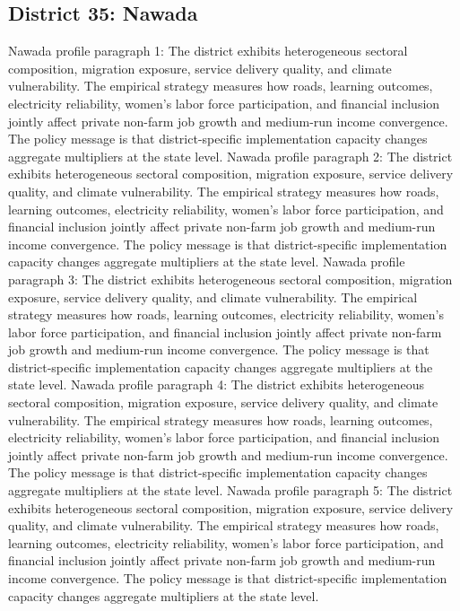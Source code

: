 \documentclass[preprint,12pt]{elsarticle}
\begin{document}
\subsection{District 35: Nawada}
Nawada profile paragraph 1: The district exhibits heterogeneous sectoral composition, migration exposure, service delivery quality, and climate vulnerability. The empirical strategy measures how roads, learning outcomes, electricity reliability, women's labor force participation, and financial inclusion jointly affect private non-farm job growth and medium-run income convergence. The policy message is that district-specific implementation capacity changes aggregate multipliers at the state level.
Nawada profile paragraph 2: The district exhibits heterogeneous sectoral composition, migration exposure, service delivery quality, and climate vulnerability. The empirical strategy measures how roads, learning outcomes, electricity reliability, women's labor force participation, and financial inclusion jointly affect private non-farm job growth and medium-run income convergence. The policy message is that district-specific implementation capacity changes aggregate multipliers at the state level.
Nawada profile paragraph 3: The district exhibits heterogeneous sectoral composition, migration exposure, service delivery quality, and climate vulnerability. The empirical strategy measures how roads, learning outcomes, electricity reliability, women's labor force participation, and financial inclusion jointly affect private non-farm job growth and medium-run income convergence. The policy message is that district-specific implementation capacity changes aggregate multipliers at the state level.
Nawada profile paragraph 4: The district exhibits heterogeneous sectoral composition, migration exposure, service delivery quality, and climate vulnerability. The empirical strategy measures how roads, learning outcomes, electricity reliability, women's labor force participation, and financial inclusion jointly affect private non-farm job growth and medium-run income convergence. The policy message is that district-specific implementation capacity changes aggregate multipliers at the state level.
Nawada profile paragraph 5: The district exhibits heterogeneous sectoral composition, migration exposure, service delivery quality, and climate vulnerability. The empirical strategy measures how roads, learning outcomes, electricity reliability, women's labor force participation, and financial inclusion jointly affect private non-farm job growth and medium-run income convergence. The policy message is that district-specific implementation capacity changes aggregate multipliers at the state level.
\end{document}
